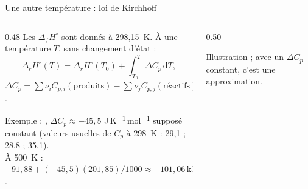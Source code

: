 \documentclass[aspectratio=169,10pt]{beamer}
\newcommand{\dfH}{\Delta_{f}H^{\circ}}
\newcommand{\drH}{\Delta_{r}H^{\circ}}
\newcommand{\kJ}{\ensuremath{\,\mathrm{kJ}}}
\begin{document}
\begin{frame}{Une autre température : loi de Kirchhoff}
  \begin{columns}[T]
    \begin{column}{0.48\textwidth}
      Les $\dfH$ sont donnés à 298,15~K. À une température $T$, sans changement
      d'état :
      \[
        \drH(T) = \drH(T_0) + \int_{T_0}^{T}\Delta C_p\,\mathrm{d}T,
      \]
      $\Delta C_p = \sum\nu_i C_{p,i}(\text{produits}) - \sum\nu_j C_{p,j}(\text{réactifs})$.

      \vspace{2mm}
      {\footnotesize Exemple : , $\Delta C_p \approx -45{,}5$
      J\,K\textsuperscript{$-1$}\,mol\textsuperscript{$-1$} supposé constant
      (valeurs usuelles de $C_p$ à 298~K : 29,1 ; 28,8 ; 35,1).\\
      À 500~K : $-91{,}88 + (-45{,}5)(201{,}85)/1000 \approx -101{,}06\kJ$.}
    \end{column}
    \begin{column}{0.50\textwidth}

      {\scriptsize Illustration ; avec un $\Delta C_p$ constant, c'est une
      approximation.}
    \end{column}
  \end{columns}
\end{frame}
\end{document}

